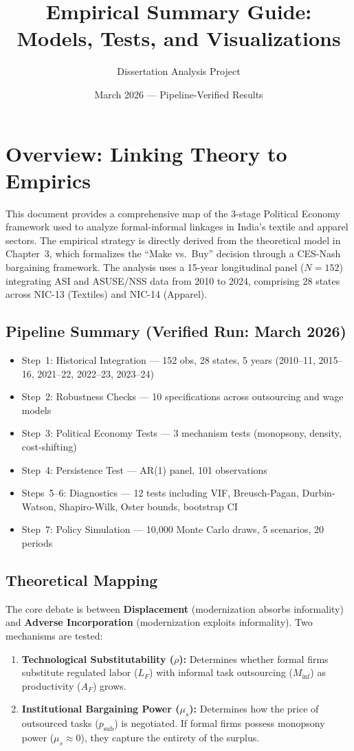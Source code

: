 \documentclass[11pt]{article}
\title{Empirical Summary Guide: Models, Tests, and Visualizations}
\author{Dissertation Analysis Project}
\date{March 2026 — Pipeline-Verified Results}
\begin{document}
	
	\maketitle
	
	\section{Overview: Linking Theory to Empirics}
	This document provides a comprehensive map of the 3-stage Political Economy framework used to analyze formal-informal linkages in India's textile and apparel sectors. The empirical strategy is directly derived from the theoretical model in Chapter~3, which formalizes the ``Make vs.\ Buy'' decision through a CES-Nash bargaining framework. The analysis uses a 15-year longitudinal panel ($N=152$) integrating ASI and ASUSE/NSS data from 2010 to 2024, comprising 28 states across NIC-13 (Textiles) and NIC-14 (Apparel).
	
	\subsection*{Pipeline Summary (Verified Run: March 2026)}
	\begin{itemize}
		\item Step~1: Historical Integration — 152 obs, 28 states, 5 years (2010–11, 2015–16, 2021–22, 2022–23, 2023–24)
		\item Step~2: Robustness Checks — 10 specifications across outsourcing and wage models
		\item Step~3: Political Economy Tests — 3 mechanism tests (monopsony, density, cost-shifting)
		\item Step~4: Persistence Test — AR(1) panel, 101 observations
		\item Steps~5–6: Diagnostics — 12 tests including VIF, Breusch-Pagan, Durbin-Watson, Shapiro-Wilk, Oster bounds, bootstrap CI
		\item Step~7: Policy Simulation — 10{,}000 Monte Carlo draws, 5 scenarios, 20 periods
	\end{itemize}
	
	\subsection*{Theoretical Mapping}
	The core debate is between \textbf{Displacement} (modernization absorbs informality) and \textbf{Adverse Incorporation} (modernization exploits informality). Two mechanisms are tested:
	\begin{enumerate}
		\item \textbf{Technological Substitutability ($\rho$):} Determines whether formal firms substitute regulated labor ($L_F$) with informal task outsourcing ($M_{\text{inf}}$) as productivity ($A_F$) grows.
		\item \textbf{Institutional Bargaining Power ($\mu_s$):} Determines how the price of outsourced tasks ($p_{\text{sub}}$) is negotiated. If formal firms possess monopsony power ($\mu_s \approx 0$), they capture the entirety of the surplus.
	\end{enumerate}
	
\end{document}
